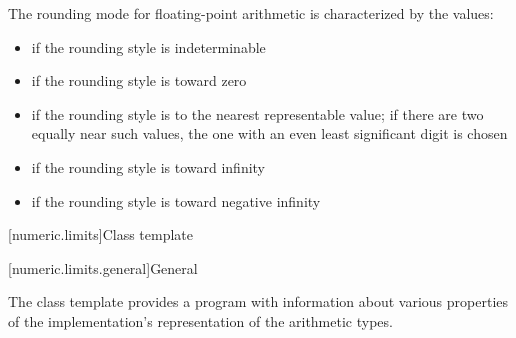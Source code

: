 \pnum
The rounding mode for floating-point arithmetic is characterized by the
values:
\begin{itemize}
\item
{}%
if the rounding style is indeterminable
\item
{}%
if the rounding style is toward zero
\item
{}%
if the rounding style is to the nearest representable value;
if there are two equally near such values,
the one with an even least significant digit is chosen
\item
{}%
if the rounding style is toward infinity
\item
{}%
if the rounding style is toward negative infinity
\end{itemize}

[numeric.limits]{Class template }

[numeric.limits.general]{General}

\pnum
The
%
class template provides a \Cpp{} program with information about various properties of
the implementation's representation of the
arithmetic types.

